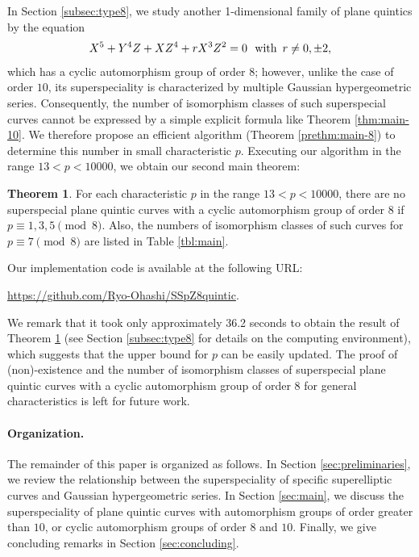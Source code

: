 \documentclass{article}
\theoremstyle{definition}
\newtheorem{Thm}[Def]{Theorem}
\begin{document}
\noindent In Section \ref{subsec:type8}, we study another 1-dimensional family of plane quintics by the equation\vspace{-0.5mm}
\[
    X^5+Y^4Z+XZ^4+rX^3Z^2 = 0 \ \text{ with }\,r \neq 0,\pm 2,\vspace{0.5mm}
\]
which has a cyclic automorphism group of order $8$; \hspace{0.5mm}however, unlike the case of order $10$, its superspeciality is characterized by multiple Gaussian hypergeometric series.
Consequently, the number of isomorphism classes of such superspecial curves cannot be expressed by a simple explicit formula like Theorem \ref{thm:main-10}.
We therefore propose an efficient algorithm (Theorem \ref{prethm:main-8}) to determine this number in small characteristic $p$.
Executing our algorithm in the range $13 < p < 10000$, we obtain our second main theorem:\vspace{-0.8mm}
\begin{Thm}\label{thm:main-8}
For each characteristic $p$ in the range $13 < p < 10000$, there are no superspecial plane quintic curves with a cyclic automorphism group of order $8$ if $p \equiv 1,3,5 \pmod{8}$.
Also, the numbers of isomorphism classes of such curves for $p \equiv 7 \pmod{8}$ are listed in Table \ref{tbl:main}.
\end{Thm}
\noindent Our implementation code is available at the following URL:\vspace{0.5mm}
\begin{center}
    \url{https://github.com/Ryo-Ohashi/SSpZ8quintic}.\vspace{1.3mm}
\end{center}
We remark that it took only approximately 36.2 seconds to obtain the result of Theorem \ref{thm:main-8} (see Section \ref{subsec:type8} for details on the computing environment), which suggests that the upper bound for $p$ can be easily updated.
The proof of (non)-existence and the number of isomorphism classes of superspecial plane quintic curves with a cyclic automorphism group of order $8$ for general characteristics is left for future work.\vspace{-2.8mm}

\paragraph{Organization.} The remainder of this paper is organized as follows.
In Section \ref{sec:preliminaries}, we review the relationship between the superspeciality of specific superelliptic curves and Gaussian hypergeometric series.
In Section \ref{sec:main}, we discuss the superspeciality of plane quintic curves with automorphism groups of order greater than $10$, or cyclic automorphism groups of order $8$ and $10$.
Finally, we give concluding remarks in Section \ref{sec:concluding}.\vspace{-2.8mm}
\end{document}
